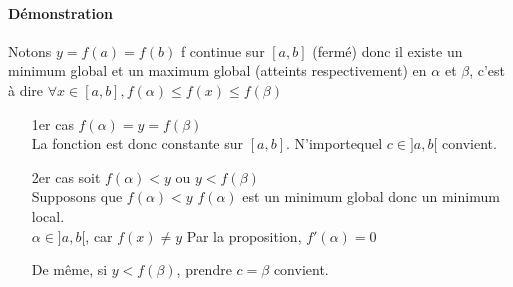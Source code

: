 	\paragraph{Démonstration} Notons $y=f(a)=f(b)$ f continue sur $[a, b]$ (fermé) donc il existe un minimum global et un maximum global (atteints respectivement) en $\alpha$ et $\beta$, c'est à dire $\forall x \in [a, b], f(\alpha) \leq f(x) \leq f(\beta)$
	\begin{itemize}
		\item[1er cas] $f(\alpha) = y = f(\beta)$ ~\\
		La fonction est donc constante sur $[a, b]$. N'importequel $c \in ]a, b[$ convient.

		\item[2er cas] soit $f(\alpha) < y$ ou $y < f(\beta)$ ~\\
		Supposons que $f(\alpha) < y$
		$f(\alpha)$ est un minimum global donc un minimum local. ~\\
		$\alpha \in ]a, b[$, car $f(x) \neq y$
			Par la proposition, $f'(\alpha)=0$

			De même, si $y < f(\beta)$, prendre $c=\beta$ convient.
	\end{itemize}
